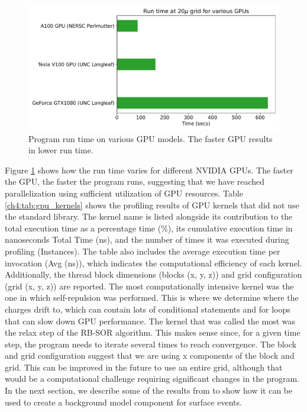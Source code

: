  \begin{figure}[!htb]
    \centering
    \includegraphics[width=0.99\linewidth]{ch4/figs/gpu_comp.pdf}
\caption{\label{ch4:fig:GPU_comp} Program run time on various GPU models. The faster GPU results in lower run time.}
\end{figure}

Figure \ref{ch4:fig:GPU_comp} shows how the run time varies for different NVIDIA GPUs. The faster the GPU, the faster the program runs, suggesting that we have reached parallelization using sufficient utilization of GPU resources. Table \ref{ch4:tab:gpu_kernels} shows the profiling results of GPU kernels that did not use the standard library. The kernel name is listed alongside its contribution to the total execution time as a percentage time ($\%$), its cumulative execution time in nanoseconds Total Time (ns), and the number of times it was executed during profiling (Instances). The table also includes the average execution time per invocation (Avg (ns)), which indicates the computational efficiency of each kernel. Additionally, the thread block dimensions (blocks (x, y, z)) and grid configuration (grid (x, y, z)) are reported. The most computationally intensive kernel was the one in which self-repulsion was performed. This is where we determine where the charges drift to, which can contain lots of conditional statements and for loops that can slow down GPU performance. The kernel that was called the most was the relax step of the RB-SOR algorithm. This makes sense since, for a given time step, the program needs to iterate several times to reach convergence. The block and grid configuration suggest that we are using x components of the block and grid. This can be improved in the future to use an entire grid, although that would be a computational challenge requiring significant changes in the program. In the next section, we describe some of the results from {\ehd} to show how it can be used to create a background model component for surface events.



